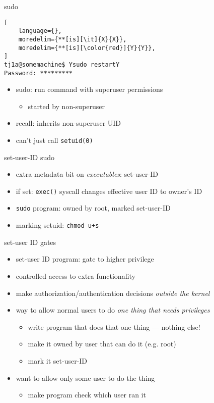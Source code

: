 \begin{frame}[fragile,label=sudoEx]{sudo}
\begin{lstlisting}[
    language={},
    moredelim={**[is][\it]{X}{X}},
    moredelim={**[is][\color{red}]{Y}{Y}},
]
tj1a@somemachine$ Ysudo restartY
Password: *********
\end{lstlisting}
\begin{itemize}
\item sudo: run command with superuser permissions
    \begin{itemize}
    \item started by non-superuser
    \end{itemize}
\item recall: inherits non-superuser UID
\item can't just call \texttt{setuid(0)}
\end{itemize}
\end{frame}

\begin{frame}{set-user-ID sudo}
\begin{itemize}
\item extra metadata bit on \textit{executables}: set-user-ID
\item if set: \texttt{exec()} syscall changes effective user ID to owner's ID
\item \texttt{sudo} program: owned by root, marked set-user-ID
\vspace{.5cm}
\item marking setuid: \texttt{chmod u+s}
\end{itemize}
\end{frame}

\begin{frame}{set-user ID gates}
\begin{itemize}
\item set-user ID program: gate to higher privilege
\vspace{.5cm}
\item controlled access to extra functionality
\item make authorization/authentication decisions \textit{outside the kernel}
\item way to allow normal users to do \textit{one thing that needs privileges}
    \begin{itemize}
    \item write program that does that one thing --- nothing else!
    \item make it owned by user that can do it (e.g. root)
    \item mark it set-user-ID
    \end{itemize}
\item want to allow only some user to do the thing
    \begin{itemize}
    \item make program check which user ran it
    \end{itemize}
\end{itemize}
\end{frame}

